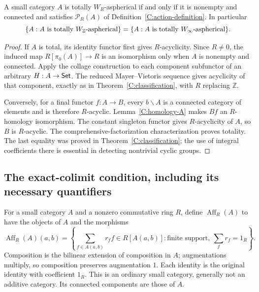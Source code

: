 \begin{theorem}\label{D:R-action}
A small category $A$ is totally $W_R$-aspherical if and only if it is nonempty and connected and satisfies $\mathcal P_R(A)$ of Definition~\ref{C:action-definition}. In particular
\[
 \{A:A\text{ is totally }W_{\mathbb Z}\text{-aspherical}\}
 =\{A:A\text{ is totally }W_{\infty}\text{-aspherical}\}.
\]
\end{theorem}
\begin{proof}
If $A$ is total, its identity functor first gives $R$-acyclicity. Since $R\ne0$, the induced map $R[\pi_0(A)]\to R$ is an isomorphism only when $A$ is nonempty and connected. Apply the collage construction to each component subfunctor of an arbitrary $H:A\to\mathsf{Set}$. The reduced Mayer--Vietoris sequence gives acyclicity of that component, exactly as in Theorem~\ref{C:classification}, with $R$ replacing $\mathbb Z$.

Conversely, for a final functor $f:A\to B$, every $b\backslash A$ is a connected category of elements and is therefore $R$-acyclic. Lemma~\ref{C:homology-A} makes $Bf$ an $R$-homology isomorphism. The constant singleton functor gives $R$-acyclicity of $A$, so $B$ is $R$-acyclic. The comprehensive-factorization characterization proves totality. The last equality was proved in Theorem~\ref{C:classification}; the use of integral coefficients there is essential in detecting nontrivial cyclic groups.
\end{proof}

\subsection{The exact-colimit condition, including its necessary quantifiers}

\begin{definition}\label{D:aff-definition}
For a small category $A$ and a nonzero commutative ring $R$, define $\operatorname{Aff}_R(A)$ to have the objects of $A$ and the morphisms
\[
 \operatorname{Aff}_R(A)(a,b)=
 \left\{\sum_{f\in A(a,b)}r_ff\in R[A(a,b)]:
       \text{finite support},\ \sum_fr_f=1_R\right\}.
\]
Composition is the bilinear extension of composition in $A$; augmentations multiply, so composition preserves augmentation $1$. Each identity is the original identity with coefficient $1_R$. This is an ordinary small category, generally not an additive category. Its connected components are those of $A$.
\end{definition}

